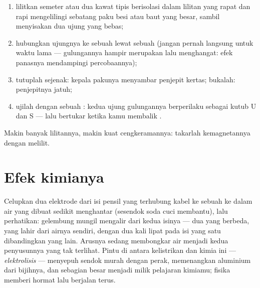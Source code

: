 \begin{method}\label{met:g8:electric-current-effects:wind}
\begin{enumerate}
  \item lilitkan semeter atau dua  kawat tipis berisolasi dalam
        lilitan yang rapat dan rapi mengelilingi sebatang paku besi
        atau baut yang besar, sambil menyisakan dua ujung yang bebas;
  \item hubungkan ujungnya ke sebuah  lewat sebuah 
        (jangan pernah langsung untuk waktu lama --- gulungannya
        hampir merupakan  lalu menghangat: efek panasnya
        mendampingi percobaannya);
  \item tutuplah  sejenak: kepala pakunya menyambar
        penjepit kertas; bukalah: penjepitnya jatuh;
  \item ujilah dengan sebuah : kedua ujung gulungannya
        berperilaku sebagai kutub U dan S --- lalu bertukar ketika
        kamu membalik .
\end{enumerate}
Makin banyak lilitannya, makin kuat cengkeramannya: takarlah
kemagnetannya dengan melilit.
\end{method}

\section{Efek kimianya}

\begin{example}\label{ex:g8:electric-current-effects:electrolysis}
Celupkan dua elektrode dari isi pensil yang terhubung kabel ke sebuah
 ke dalam air yang dibuat sedikit menghantar (sesendok soda
cuci membantu), lalu perhatikan: gelembung mungil mengalir dari kedua
isinya --- dua  yang berbeda, yang lahir dari airnya sendiri,
dengan  dua kali lipat pada isi yang satu dibandingkan yang
lain. Arusnya sedang membongkar air menjadi kedua penyusunnya yang tak
terlihat. Pintu di antara kelistrikan dan kimia ini ---
\emph{elektrolisis} --- menyepuh sendok murah dengan perak,
memenangkan aluminium dari bijihnya, dan sebagian besar menjadi milik
pelajaran kimiamu; fisika memberi hormat lalu berjalan terus.
\end{example}

